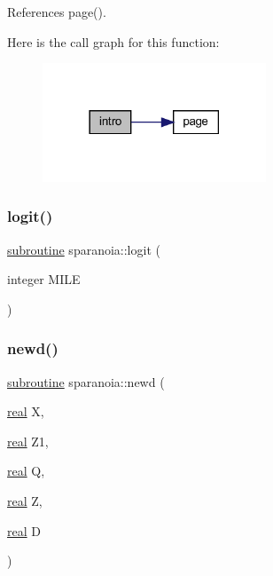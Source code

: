 References page().

Here is the call graph for this function\+:
\nopagebreak
\begin{figure}[H]
\begin{center}
\leavevmode
\includegraphics[width=189pt]{sparanoia_8f90_a08fb2993ab64ff8eadc9bbcdee178dfa_cgraph}
\end{center}
\end{figure}
\mbox{\label{sparanoia_8f90_ae605cf6771f748638a7ec12933f8ad86}} 
\subsubsection{\texorpdfstring{logit()}{logit()}}
{\footnotesize\ttfamily \hyperlink{M__stopwatch_83_8txt_acfbcff50169d691ff02d4a123ed70482}{subroutine} sparanoia\+::logit (\begin{DoxyParamCaption}\item[{integer}]{M\+I\+LE }\end{DoxyParamCaption})}

\mbox{\label{sparanoia_8f90_a1a7c7f32e1cdfae6821cd45ce4579c29}} 
\subsubsection{\texorpdfstring{newd()}{newd()}}
{\footnotesize\ttfamily \hyperlink{M__stopwatch_83_8txt_acfbcff50169d691ff02d4a123ed70482}{subroutine} sparanoia\+::newd (\begin{DoxyParamCaption}\item[{\hyperlink{read__watch_83_8txt_abdb62bde002f38ef75f810d3a905a823}{real}}]{X,  }\item[{\hyperlink{read__watch_83_8txt_abdb62bde002f38ef75f810d3a905a823}{real}}]{Z1,  }\item[{\hyperlink{read__watch_83_8txt_abdb62bde002f38ef75f810d3a905a823}{real}}]{Q,  }\item[{\hyperlink{read__watch_83_8txt_abdb62bde002f38ef75f810d3a905a823}{real}}]{Z,  }\item[{\hyperlink{read__watch_83_8txt_abdb62bde002f38ef75f810d3a905a823}{real}}]{D }\end{DoxyParamCaption})}

